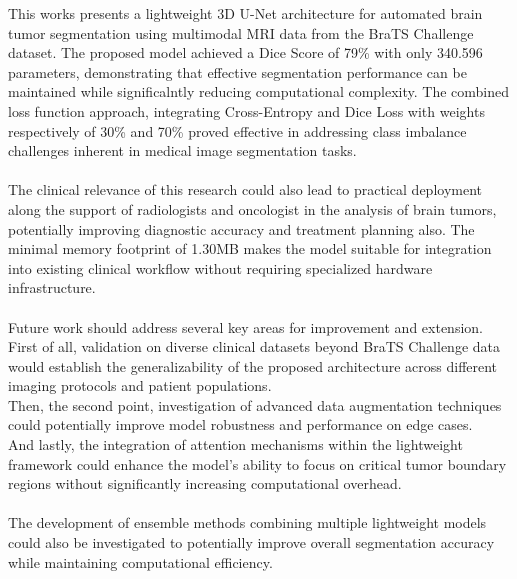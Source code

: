 \documentclass[10pt,twocolumn,letterpaper]{article}
\begin{document}
This works presents a lightweight 3D U-Net architecture for automated brain tumor segmentation using multimodal MRI data from the BraTS Challenge dataset. The proposed model achieved a Dice Score of 79\% with only 340.596  parameters, demonstrating that effective segmentation performance can be maintained while significalntly reducing computational complexity. The combined loss function approach, integrating Cross-Entropy and Dice Loss with weights respectively of 30\% and 70\% proved effective in addressing class imbalance challenges inherent in medical image segmentation tasks.\\\\
The clinical relevance of this research could also lead to practical deployment along the support of radiologists and oncologist in the analysis of brain tumors, potentially improving diagnostic accuracy and treatment planning also. The minimal memory footprint of 1.30MB makes the model suitable for integration into existing clinical workflow without requiring specialized hardware infrastructure.\\\\
Future work should address several key areas for improvement and extension. First of all, validation on diverse clinical datasets beyond BraTS Challenge data would establish the generalizability of the proposed architecture across different imaging protocols and patient populations.\\ Then, the second point, investigation of advanced data augmentation techniques could potentially improve model robustness and performance on edge cases.\\ And lastly, the integration of attention mechanisms within the lightweight framework could enhance the model's ability to focus on critical tumor boundary regions without significantly increasing computational overhead. \\\\
The development of ensemble methods combining multiple lightweight models could also be investigated to potentially improve overall segmentation accuracy while maintaining computational efficiency. 


{\small


}
\end{document}
